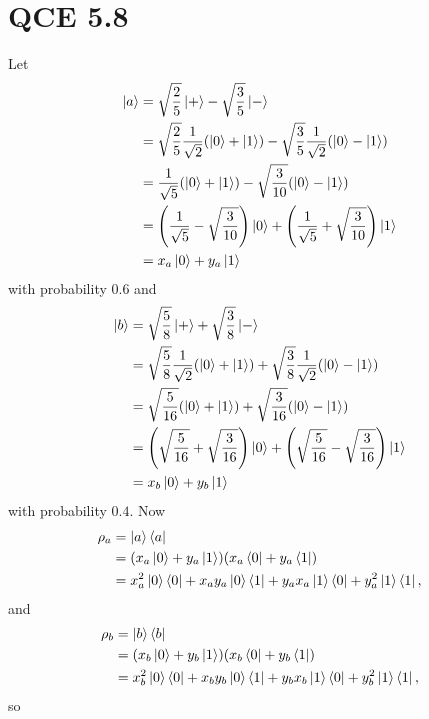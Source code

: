 \documentclass[10pt]{article}
\begin{document}
\section*{QCE 5.8}
Let 
\begin{align*}
\ket{a} &= \sqrt{\frac{2}{5}} \ket{+} - \sqrt{\frac{3}{5}} \ket{-} \\
           &= \sqrt{\frac{2}{5}} \frac{1}{\sqrt{2}} (\ket{0} + \ket{1}) - \sqrt{\frac{3}{5}} \frac{1}{\sqrt{2}} (\ket{0} - \ket{1}) \\
           &= \frac{1}{\sqrt{5}} ( \ket{0} + \ket{1} ) - \sqrt{\frac{3}{10}} (\ket{0} - \ket{1}) \\
           &= \Bigg( \frac{1}{\sqrt{5}} - \sqrt{\frac{3}{10}}\Bigg) \ket{0} + \Bigg( \frac{1}{\sqrt{5}} + \sqrt{\frac{3}{10}}\Bigg) \ket{1} \\
           &= x_a \ket{0} + y_a \ket{1}
\end{align*}
with probability $0.6$ and
\begin{align*}
\ket{b} &= \sqrt{\frac{5}{8}} \ket{+} + \sqrt{\frac{3}{8}} \ket{-} \\
           &= \sqrt{\frac{5}{8}} \frac{1}{\sqrt{2}} (\ket{0} + \ket{1}) + \sqrt{\frac{3}{8}} \frac{1}{\sqrt{2}} (\ket{0} - \ket{1}) \\
           &= \sqrt{\frac{5}{16}} (\ket{0} + \ket{1}) + \sqrt{\frac{3}{16}} (\ket{0} - \ket{1}) \\
           &= \Bigg( \sqrt{\frac{5}{16}} + \sqrt{\frac{3}{16}} \Bigg) \ket{0} + \Bigg( \sqrt{\frac{5}{16}} - \sqrt{\frac{3}{16}}\Bigg) \ket{1} \\
           &= x_b \ket{0} + y_b \ket{1}
\end{align*}
with probability $0.4$. Now
\begin{align*}
\rho_a &= \ket{a} \bra{a} \\
           &= ( x_a \ket{0} + y_a \ket{1} ) ( x_a \bra{0} + y_a \bra{1} ) \\
           &= x_a^2 \ket{0} \bra{0} + x_a y_a \ket{0} \bra{1} + y_a x_a \ket{1} \bra{0} + y_a^2 \ket{1} \bra{1},
\end{align*}
and 
\begin{align*}
\rho_b &= \ket{b} \bra{b} \\
           &= ( x_b \ket{0} + y_b \ket{1} ) ( x_b \bra{0} + y_b \bra{1} ) \\
           &= x_b^2 \ket{0} \bra{0} + x_b y_b \ket{0} \bra{1} + y_b x_b \ket{1} \bra{0} + y_b^2 \ket{1} \bra{1},
\end{align*}
so
\end{document}

